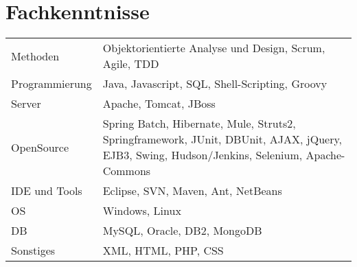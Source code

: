 \section*{Fachkenntnisse}
\begin{longtable}{@{}p{6cm}p{10cm}}
Methoden	& Objektorientierte Analyse und Design, Scrum, Agile, TDD\\
Programmierung	& Java, Javascript, SQL, Shell-Scripting, Groovy\\
Server		& Apache, Tomcat, JBoss\\
OpenSource	& Spring Batch, Hibernate, Mule, Struts2, Springframework, JUnit, DBUnit, AJAX, jQuery, EJB3, Swing, Hudson/Jenkins, Selenium, Apache-Commons\\
IDE und Tools	& Eclipse, SVN, Maven, Ant, NetBeans\\
OS		& Windows, Linux\\
DB		& MySQL, Oracle, DB2, MongoDB\\
Sonstiges	& XML, HTML, PHP, CSS
\end{longtable}
